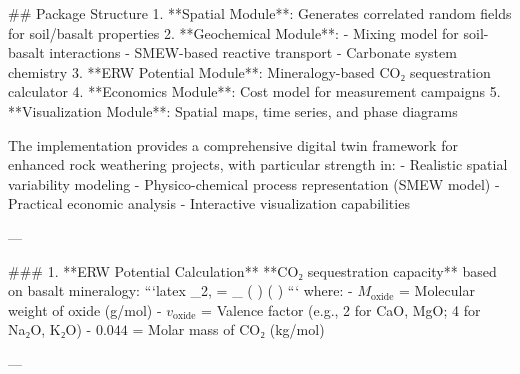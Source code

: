 ## Package Structure
1. **Spatial Module**: Generates correlated random fields for soil/basalt properties
2. **Geochemical Module**: 
   - Mixing model for soil-basalt interactions
   - SMEW-based reactive transport
   - Carbonate system chemistry
3. **ERW Potential Module**: Mineralogy-based CO₂ sequestration calculator
4. **Economics Module**: Cost model for measurement campaigns
5. **Visualization Module**: Spatial maps, time series, and phase diagrams

The implementation provides a comprehensive digital twin framework for enhanced rock weathering projects, with particular strength in:
- Realistic spatial variability modeling
- Physico-chemical process representation (SMEW model)
- Practical economic analysis
- Interactive visualization capabilities




---

### 1. **ERW Potential Calculation**
**CO₂ sequestration capacity** based on basalt mineralogy:
```latex
_{2,} = \sum_{} \left(  \right) \times {} \times \left(  \right) 
```
where:
- \(M_{\text{oxide}}\) = Molecular weight of oxide (g/mol)
- \(v_{\text{oxide}}\) = Valence factor (e.g., 2 for CaO, MgO; 4 for Na₂O, K₂O)
- \(0.044\) = Molar mass of CO₂ (kg/mol)

---

